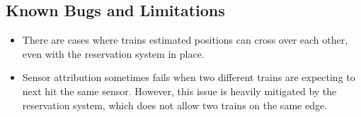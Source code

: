 \documentclass{article}
\begin{document}
\subsection{Known Bugs and Limitations}
\begin{itemize}
  \item There are cases where trains estimated positions can cross over each other, even with the reservation system in place.
  \item Sensor attribution sometimes fails when two different trains are expecting to next hit the same sensor. However, this issue is heavily mitigated by the reservation system, which does not allow two trains on the same edge.
\end{itemize}
\end{document}
